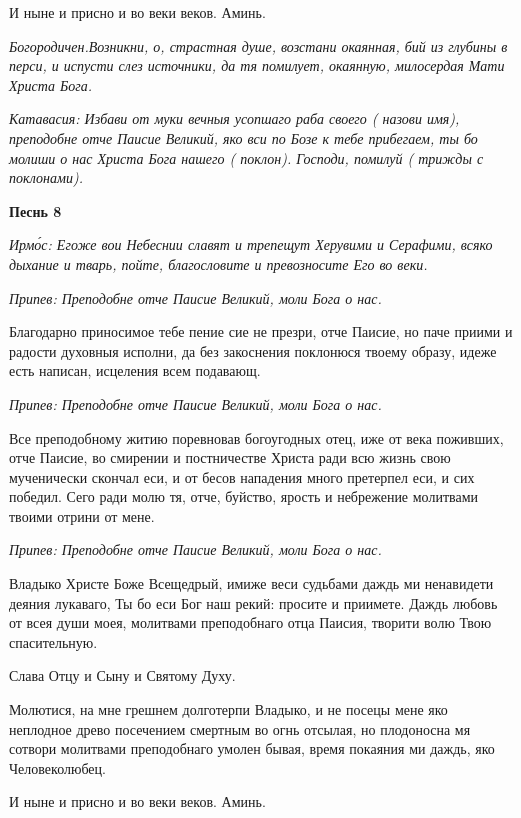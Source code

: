 И ныне и присно и во веки веков. Аминь.


\itshape Богородичен.\normalfont{}Возникни, о, страстная душе, возстани окаянная, бий из глубины в перси, и испусти слез источники, да тя помилует, окаянную, милосердая Мати Христа Бога.


\itshape Катавасия:\normalfont{} Избави от муки вечныя усопшаго раба своего ( \itshape назови имя\normalfont{}), преподобне отче Паисие Великий, яко вси по Бозе к тебе прибегаем, ты бо молиши о нас Христа Бога нашего ( \itshape поклон\normalfont{}). Господи, помилуй ( \itshape трижды с поклонами\normalfont{}).





\bfseries Песнь 8\normalfont{}


\itshape Ирмо́с:\normalfont{} Егоже вои Небеснии славят и трепещут Херувими и Серафими, всяко дыхание и тварь, пойте, благословите и превозносите Его во веки.


\itshape Припев:\normalfont{} Преподобне отче Паисие Великий, моли Бога о нас.


Благодарно приносимое тебе пение сие не презри, отче Паисие, но паче приими и радости духовныя исполни, да без закоснения поклонюся твоему образу, идеже есть написан, исцеления всем подавающ.


\itshape Припев:\normalfont{} Преподобне отче Паисие Великий, моли Бога о нас.


Все преподобному житию поревновав богоугодных отец, иже от века поживших, отче Паисие, во смирении и постничестве Христа ради всю жизнь свою мученически скончал еси, и от бесов нападения много претерпел еси, и сих победил. Сего ради молю тя, отче, буйство, ярость и небрежение молитвами твоими отрини от мене.


\itshape Припев:\normalfont{} Преподобне отче Паисие Великий, моли Бога о нас.


Владыко Христе Боже Всещедрый, имиже веси судьбами даждь ми ненавидети деяния лукаваго, Ты бо еси Бог наш рекий: просите и приимете. Даждь любовь от всея души моея, молитвами преподобнаго отца Паисия, творити волю Твою спасительную.


Слава Отцу и Сыну и Святому Духу.


Молютися, на мне грешнем долготерпи Владыко, и не посецы мене яко неплодное древо посечением смертным во огнь отсылая, но плодоносна мя сотвори молитвами преподобнаго умолен бывая, время покаяния ми даждь, яко Человеколюбец.


И ныне и присно и во веки веков. Аминь.


